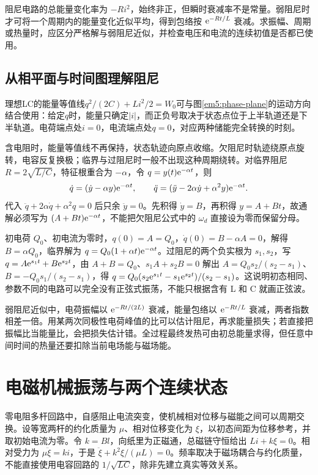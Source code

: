 阻尼电路的总能量变化率为 $-Ri^2$，始终非正，但瞬时衰减率不是常量。弱阻尼时才可将一个周期内的能量变化近似平均，得到包络按 $\mathrm e^{-Rt/L}$ 衰减。求振幅、周期或热量时，应区分严格解与弱阻尼近似，并检查电压和电流的连续初值是否都已使用。


\subsection{从相平面与时间图理解阻尼}



理想LC的能量等值线$q^2/(2C)+Li^2/2=W_0$可与图\ref{em5:phase-plane}的运动方向结合使用：给定$q$时，能量只确定$|i|$，而正负号取决于状态点位于上半轨道还是下半轨道。电荷端点处$i=0$，电流端点处$q=0$，对应两种储能完全转换的时刻。

含电阻时，能量等值线不再保持，状态轨迹向原点收缩。欠阻尼时轨迹绕原点旋转，电容反复换极；临界与过阻尼时一般不出现这种周期绕转。对临界阻尼 $R=2\sqrt{L/C}$，特征根重合为 $-\alpha$，令 $q=y(t)\mathrm e^{-\alpha t}$，则
\[
\dot q=(\dot y-\alpha y)\mathrm e^{-\alpha t},\qquad
\ddot q=(\ddot y-2\alpha\dot y+\alpha^2y)\mathrm e^{-\alpha t}.
\]
代入 $\ddot q+2\alpha\dot q+\alpha^2q=0$ 后只余 $\ddot y=0$。先积得 $\dot y=B$，再积得 $y=A+Bt$，故通解必须写为 $(A+Bt)\mathrm e^{-\alpha t}$，不能把欠阻尼公式中的 $\omega_d$ 直接设为零而保留分母。

初电荷 $Q_0$、初电流为零时，$q(0)=A=Q_0$，$\dot q(0)=B-\alpha A=0$，解得 $B=\alpha Q_0$，临界解为 $q=Q_0(1+\alpha t)\mathrm e^{-\alpha t}$。过阻尼的两个负实根为 $s_1,s_2$，写 $q=A\mathrm e^{s_1t}+B\mathrm e^{s_2t}$，由 $A+B=Q_0$、$s_1A+s_2B=0$ 解出 $A=Q_0s_2/(s_2-s_1)$、$B=-Q_0s_1/(s_2-s_1)$，得 $q=Q_0(s_2\mathrm e^{s_1t}-s_1\mathrm e^{s_2t})/(s_2-s_1)$。这说明初态相同、参数不同的电路可以完全没有正弦式振荡，不能只根据含有 L 和 C 就画正弦波。

弱阻尼近似中，电荷振幅以 $\mathrm e^{-Rt/(2L)}$ 衰减，能量包络以 $\mathrm e^{-Rt/L}$ 衰减，两者指数相差一倍。用某两次同极性电荷峰值的比可以估计阻尼，再求能量损失；若直接把振幅比当能量比，会把损失估计错。全过程最终发热可由初总能量求得，但任意中间时间的热量还要扣除当前电场能与磁场能。




\section{电磁机械振荡与两个连续状态}

零电阻多杆回路中，自感阻止电流突变，使机械相对位移与磁能之间可以周期交换。设等宽两杆的约化质量为 $\mu$、相对位移变化为 $\xi$，以初态间距为位移参考，并取初始电流为零。令 $k=Bl$，向纸里为正磁通，总磁链守恒给出 $Li+k\xi=0$。相对受力为 $\mu\ddot\xi=ki$，于是 $\ddot\xi+k^2\xi/(\mu L)=0$。频率取决于磁场耦合与约化质量，不能直接使用电容回路的 $1/\sqrt{LC}$，除非先建立真实等效关系。


